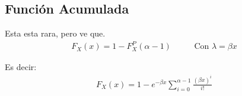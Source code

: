 \documentclass[12pt, fleqn]{report}                             %
\DeclareMathOperator \MegaSpace {\quad \quad}                   %
\theoremstyle{break}                                            %
\begin{document}
            \subsection{Función Acumulada}

                Esta esta rara, pero ve que.
                \begin{align*}
                    F_X(x) = 1 - F_X^P (\alpha - 1) \MegaSpace \text{Con $\lambda = \beta x$}
                \end{align*}

                Es decir:
                \begin{align*}
                    F_X(x) = 1 - e^{-\beta x} \sum_{i = 0}^{\alpha - 1} \frac{(\beta x)^i}{i!}
                \end{align*}
\end{document}
